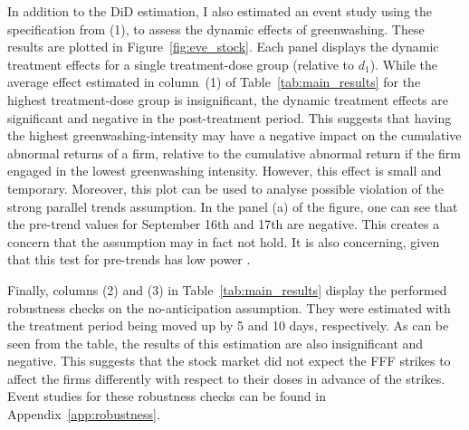 \documentclass[12pt]{article}
\begin{document}
In addition to the DiD estimation, I also estimated an event study using the specification from (1), to assess the dynamic effects of greenwashing. These results are plotted in Figure~\ref{fig:eve_stock}. Each panel displays the dynamic treatment effects for a single treatment-dose group (relative to $d_1$). While the average effect estimated in column~(1) of Table~\ref{tab:main_results} for the highest treatment-dose group is insignificant, the dynamic treatment effects are significant and negative in the post-treatment period. This suggests that having the highest greenwashing-intensity may have a negative impact on the cumulative abnormal returns of a firm, relative to the cumulative abnormal return if the firm engaged in the lowest greenwashing intensity. However, this effect is small and temporary. Moreover, this plot can be used to analyse possible violation of the strong parallel trends assumption. In the panel (a) of the figure, one can see that the pre-trend values for September 16th and 17th are negative. This creates a concern that the assumption may in fact not hold. It is also concerning, given that this test for pre-trends has low power \parencite{rothWhatsTrendingDifferenceindifferences2023}.
                            

Finally, columns (2) and (3) in Table~\ref{tab:main_results} display the performed robustness checks on the no-anticipation assumption. They were estimated with the treatment period being moved up by 5 and 10 days, respectively. As can be seen from the table, the results of this estimation are also insignificant and negative. This suggests that the stock market did not expect the FFF strikes to affect the firms differently with respect to their doses in advance of the strikes. Event studies for these robustness checks can be found in Appendix~\ref{app:robustness}.
\end{document}
